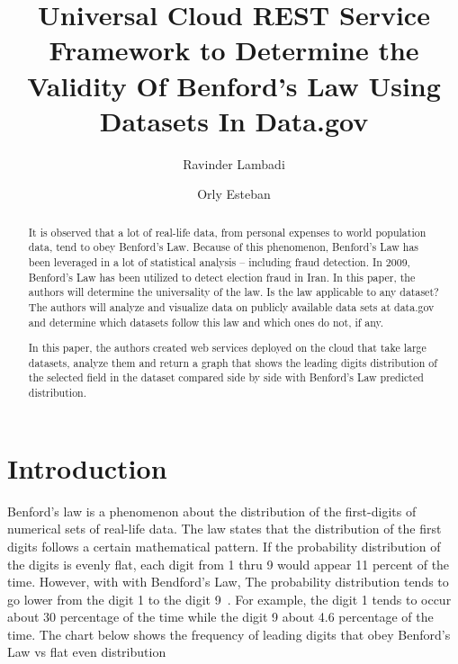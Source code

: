 
\title{Universal Cloud REST Service Framework to Determine 
the Validity Of Benford’s Law Using Datasets In Data.gov}

\author{Ravinder Lambadi}


\author{Orly Esteban}

\begin{abstract}
It is observed that a lot of real-life data, from personal 
expenses to world population data, tend to obey Benford’s Law. 
Because of this phenomenon, Benford’s Law has been leveraged 
in a lot of statistical analysis – including fraud detection. 
In 2009,  Benford’s Law has been utilized to detect election 
fraud in Iran. In this paper, the authors will determine the 
universality of the law. Is the law applicable to any dataset? 
The authors will analyze and visualize data on publicly 
available data sets at data.gov and determine which 
datasets follow this law and which ones do not, if any.

In this paper, the authors created web services deployed 
on the cloud that take large datasets, analyze them and 
return a graph that shows the leading digits distribution 
of the selected field in the dataset compared side by side 
with Benford’s Law predicted distribution.

\end{abstract}


\maketitle

\section{Introduction}
Benford’s law is a phenomenon about the distribution 
of the first-digits of numerical sets of real-life data. 
The law states that the distribution of the first digits
follows a certain mathematical pattern. If the probability 
distribution of the digits is evenly flat, each digit from 
1 thru 9 would appear 11 percent of the time. However, 
with with Bendford’s Law, The probability distribution 
tends to go lower from the digit 1 to the digit 
9~\cite{hid-sp18-514-benfordwiki}.
For example, the digit 1 tends to occur about 30 percentage 
of the time while the digit 9 about 4.6 percentage 
of the time. The chart below shows the frequency of 
leading digits that obey Benford’s Law vs flat even distribution


